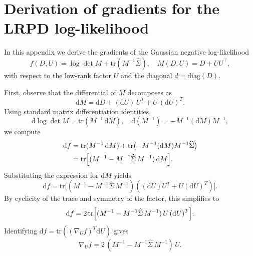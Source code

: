 \documentclass[final,hidelinks,onefignum,onetabnum]{siamart250211}
\providecommand{\1}{\mathbf{1}}
\theoremstyle{plain}
\begin{document}








\newpage
\appendix

\section{Derivation of gradients for the LRPD log-likelihood}
\label{app:gradients}

In this appendix we derive the gradients of the Gaussian negative log-likelihood
\[
f(D,U) = \log\det M + \mathrm{tr}(M^{-1}\widehat\Sigma),
\quad M(D,U)=D+UU^\top,
\]
with respect to the low-rank factor $U$ and the diagonal $d=\mathrm{diag}(D)$.

First, observe that the differential of $M$ decomposes as
\[
\mathrm{d}M = \mathrm{d}D + (\mathrm{d}U)\,U^T + U\,(\mathrm{d}U)^T.
\]
Using standard matrix differentiation identities,
\[
\mathrm{d}\log\det M = \mathrm{tr}(M^{-1}\,\mathrm{d}M),
\quad
\mathrm{d}(M^{-1}) = -M^{-1}(\mathrm{d}M)M^{-1},
\]
we compute
\begin{align*}
\mathrm{d}f
&= \mathrm{tr}(M^{-1}\,\mathrm{d}M)
+ \mathrm{tr}\bigl(-M^{-1}(\mathrm{d}M)M^{-1}\widehat\Sigma\bigr) \\
&= \mathrm{tr}\Bigl[(M^{-1}-M^{-1}\widehat\Sigma\,M^{-1})\,\mathrm{d}M\Bigr].
\end{align*}
Substituting the expression for $\mathrm{d}M$ yields
\[
\mathrm{d}f
= \mathrm{tr}\bigl[(M^{-1}-M^{-1}\widehat\Sigma\,M^{-1})
((\mathrm{d}U)U^T + U(\mathrm{d}U)^T)\bigr].
\]
By cyclicity of the trace and symmetry of the factor, this simplifies to
\[
\mathrm{d}f
= 2\,\mathrm{tr}\Bigl[(M^{-1}-M^{-1}\widehat\Sigma\,M^{-1})
\,U\,(\mathrm{d}U)^T\Bigr].
\]
Identifying $\mathrm{d}f=\mathrm{tr}((\nabla_U f)^T\mathrm{d}U)$ gives
\[
\nabla_U f = 2\,(M^{-1}-M^{-1}\widehat\Sigma\,M^{-1})\,U.
\]
\end{document}
